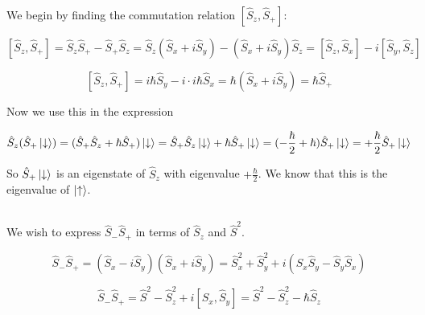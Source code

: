 \documentclass[11pt]{article}
\begin{document}
\begin{flushleft}
We begin by finding the commutation relation $[\hat{S}_z, \hat{S}_+]$:

$$
[\hat{S}_z, \hat{S}_+] = \hat{S}_z \hat{S}_+ - \hat{S}_+ \hat{S}_z = \hat{S}_z (\hat{S}_x + i \hat{S}_y) - (\hat{S}_x + i \hat{S}_y) \hat{S}_z = [\hat{S}_z, \hat{S}_x] - i [\hat{S}_y, \hat{S}_z]
$$

$$
[\hat{S}_z, \hat{S}_+] = i \hbar \hat{S}_y - i \cdot i \hbar \hat{S}_x = \hbar (\hat{S}_x + i \hat{S}_y) = \hbar \hat{S}_+
$$

Now we use this in the expression

$$
\hat{S}_z ( \hat{S}_+ \ket{\downarrow}) = (\hat{S}_+\hat{S}_z +\hbar \hat{S}_+) \ket{\downarrow} = \hat{S}_+\hat{S}_z \ket{\downarrow} +\hbar \hat{S}_+ \ket{\downarrow} = ( - \frac{\hbar}{2} + \hbar) \hat{S}_+ \ket{\downarrow} = +\frac{ \hbar}{2} \hat{S}_+ \ket{\downarrow}
$$


So $\hat{S}_+ \ket{\downarrow}$ is an eigenstate of $\hat{S}_z$ with eigenvalue $+ \frac{\hbar}{2}$. We know that this is the eigenvalue of $\ket{\uparrow}$. 
\end{flushleft}


\subsection{}

\begin{flushleft}
We wish to express $\hat{S}_- \hat{S}_+$ in terms of $\hat{S}_z$ and $\hat{S}^2$.

$$
\hat{S}_- \hat{S}_+ = (\hat{S}_x - i \hat{S}_y)(\hat{S}_x + i \hat{S}_y) = \hat{S}_x^2 + \hat{S}_y^2 + i(\hat{S}_x \hat{S}_y - \hat{S}_y \hat{S}_x) 
$$

$$
\hat{S}_- \hat{S}_+ = \hat{S}^2 - \hat{S}_z^2 + i[\hat{S}_x, \hat{S}_y] = \hat{S}^2 - \hat{S}_z^2 - \hbar \hat{S}_z
$$
\end{flushleft}
\end{document}

